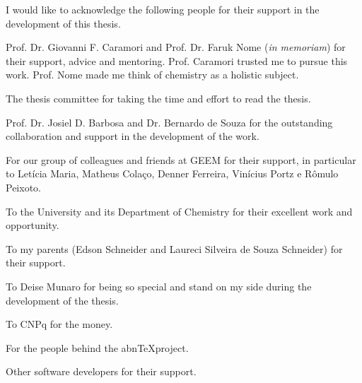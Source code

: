 \begin{agradecimentos}
I would like to acknowledge the following people for their support in the
development of this thesis.

Prof. Dr. Giovanni F. Caramori and
Prof. Dr. Faruk Nome (\emph{in memoriam})
for their support, advice and mentoring.
Prof. Caramori trusted me to pursue this work.
Prof. Nome made me think of chemistry as a holistic subject.

The thesis committee for taking the time and effort to read the thesis.

Prof. Dr. Josiel D. Barbosa and
Dr. Bernardo de Souza
for the outstanding collaboration and support in the development of the work.

For our group of colleagues and friends at GEEM for their support, in particular to
Letícia Maria, Matheus Colaço, Denner Ferreira, Vinícius Portz e Rômulo Peixoto.

To the University and its Department of Chemistry
for their excellent work and opportunity.

To my parents (Edson Schneider and Laureci Silveira de Souza Schneider)
for their support.

To Deise Munaro for being so special
and stand on my side during the development of the thesis.

To CNPq for the money.

For the people behind the abn\TeX project.

Other software developers for their support.

\end{agradecimentos}
